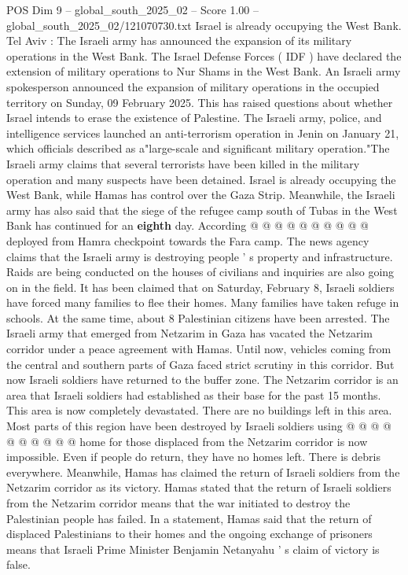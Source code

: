 \begin{textsample}{POS Dim 9 – global\_south\_2025\_02 – Score 1.00 – global\_south\_2025\_02/121070730.txt}  \label{ex:f9_pos_398}
Israel is already occupying the West Bank.
Tel Aviv : The Israeli army has announced the expansion of its military operations in the West Bank.
The Israel Defense Forces ( IDF ) have declared the extension of military operations to Nur Shams in the West Bank.
An Israeli army spokesperson announced the expansion of military operations in the occupied territory on Sunday, 09 February 2025.
This has raised questions about whether Israel intends to erase the existence of Palestine.
The Israeli army, police, and intelligence services launched an anti-terrorism operation in Jenin on January 21, which officials described as a"large-scale and significant military operation."The Israeli army claims that several terrorists have been killed in the military operation and many suspects have been detained.
Israel is already occupying the West Bank, while Hamas has control over the Gaza Strip.
Meanwhile, the Israeli army has also said that the siege of the refugee camp south of Tubas in the West Bank has continued for an \textbf{eighth} day.
According @ @ @ @ @ @ @ @ @ @ deployed from Hamra checkpoint towards the Fara camp.
The news agency claims that the Israeli army is destroying people ' s property and infrastructure.
Raids are being conducted on the houses of civilians and inquiries are also going on in the field.
It has been claimed that on Saturday, February 8, Israeli soldiers have forced many families to flee their homes.
Many families have taken refuge in schools.
At the same time, about 8 Palestinian citizens have been arrested.
The Israeli army that emerged from Netzarim in Gaza has vacated the Netzarim corridor under a peace agreement with Hamas.
Until now, vehicles coming from the central and southern parts of Gaza faced strict scrutiny in this corridor.
But now Israeli soldiers have returned to the buffer zone.
The Netzarim corridor is an area that Israeli soldiers had established as their base for the past 15 months.
This area is now completely devastated.
There are no buildings left in this area.
Most parts of this region have been destroyed by Israeli soldiers using @ @ @ @ @ @ @ @ @ @ home for those displaced from the Netzarim corridor is now impossible.
Even if people do return, they have no homes left.
There is debris everywhere.
Meanwhile, Hamas has claimed the return of Israeli soldiers from the Netzarim corridor as its victory.
Hamas stated that the return of Israeli soldiers from the Netzarim corridor means that the war initiated to destroy the Palestinian people has failed.
In a statement, Hamas said that the return of displaced Palestinians to their homes and the ongoing exchange of prisoners means that Israeli Prime Minister Benjamin Netanyahu ' s claim of victory is false.

\end{textsample}
